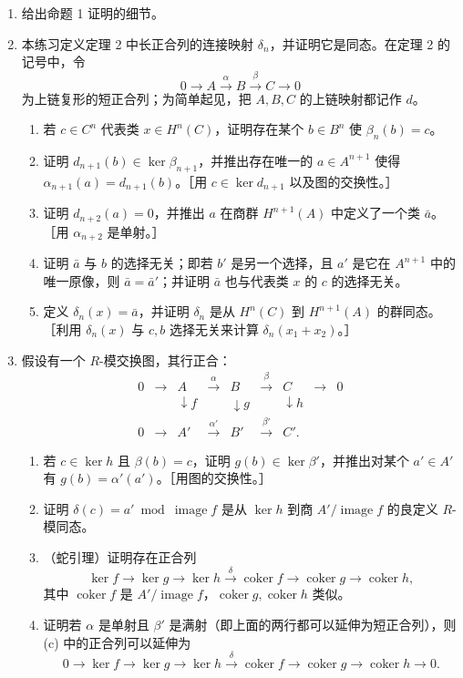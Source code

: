 \begin{enumerate}[label=\arabic*.]
  \item 给出命题 1 证明的细节。

  \item 本练习定义定理 2 中长正合列的连接映射 $\delta_n$，并证明它是同态。在定理 2 的记号中，令
  \[
    0\to A\xrightarrow{\alpha}B\xrightarrow{\beta}C\to0
  \]
  为上链复形的短正合列；为简单起见，把 $A,B,C$ 的上链映射都记作 $d$。
  \begin{enumerate}[label=(\alph*)]
    \item 若 $c\in C^n$ 代表类 $x\in H^n(C)$，证明存在某个 $b\in B^n$ 使 $\beta_n(b)=c$。
    \item 证明 $d_{n+1}(b)\in\ker\beta_{n+1}$，并推出存在唯一的 $a\in A^{n+1}$ 使得 $\alpha_{n+1}(a)=d_{n+1}(b)$。［用 $c\in\ker d_{n+1}$ 以及图的交换性。］
    \item 证明 $d_{n+2}(a)=0$，并推出 $a$ 在商群 $H^{n+1}(A)$ 中定义了一个类 $\bar a$。［用 $\alpha_{n+2}$ 是单射。］
    \item 证明 $\bar a$ 与 $b$ 的选择无关；即若 $b'$ 是另一个选择，且 $a'$ 是它在 $A^{n+1}$ 中的唯一原像，则 $\bar a=\bar a'$；并证明 $\bar a$ 也与代表类 $x$ 的 $c$ 的选择无关。
    \item 定义 $\delta_n(x)=\bar a$，并证明 $\delta_n$ 是从 $H^n(C)$ 到 $H^{n+1}(A)$ 的群同态。［利用 $\delta_n(x)$ 与 $c,b$ 选择无关来计算 $\delta_n(x_1+x_2)$。］
  \end{enumerate}

  \item 假设有一个 $R$-模交换图，其行正合：
  \[
  \begin{array}{ccccccccc}
   0&\to&A&\xrightarrow{\alpha}&B&\xrightarrow{\beta}&C&\to&0\\
   &&\downarrow f&&\downarrow g&&\downarrow h&&\\
   0&\to&A'&\xrightarrow{\alpha'}&B'&\xrightarrow{\beta'}&C' .&&
  \end{array}
  \]
  \begin{enumerate}[label=(\alph*)]
    \item 若 $c\in\ker h$ 且 $\beta(b)=c$，证明 $g(b)\in\ker\beta'$，并推出对某个 $a'\in A'$ 有 $g(b)=\alpha'(a')$。［用图的交换性。］
    \item 证明 $\delta(c)=a'\bmod\operatorname{image}f$ 是从 $\ker h$ 到商 $A'/\operatorname{image}f$ 的良定义 $R$-模同态。
    \item （蛇引理）证明存在正合列
    \[
      \ker f\to\ker g\to\ker h\xrightarrow{\delta}\operatorname{coker} f\to\operatorname{coker} g\to\operatorname{coker} h,
    \]
    其中 $\operatorname{coker} f$ 是 $A'/\operatorname{image}f$，$\operatorname{coker} g,\operatorname{coker} h$ 类似。
    \item 证明若 $\alpha$ 是单射且 $\beta'$ 是满射（即上面的两行都可以延伸为短正合列），则 (c) 中的正合列可以延伸为
    \[
      0\to\ker f\to\ker g\to\ker h\xrightarrow{\delta}\operatorname{coker} f\to\operatorname{coker} g\to\operatorname{coker} h\to0.
    \]
  \end{enumerate}


\end{enumerate}
